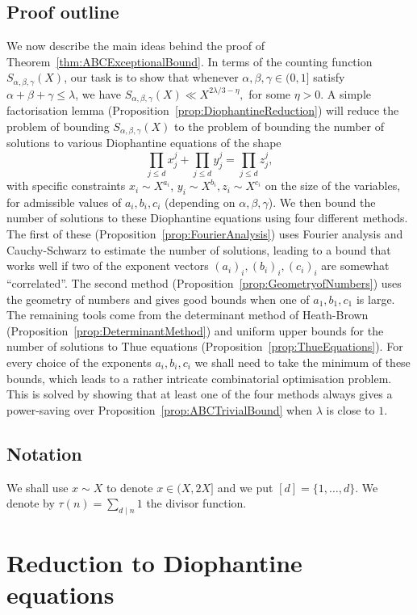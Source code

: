 \section*{Proof outline} We now describe the main ideas behind the proof of Theorem~\ref{thm:ABCExceptionalBound}. In terms of the counting function $S_{\alpha,\beta,\gamma}(X)$, our task is to show that whenever $\alpha,\beta,\gamma\in (0,1]$ satisfy $\alpha+\beta+\gamma\leq \lambda$, we have
$
S_{\alpha,\beta,\gamma}(X)\ll X^{2\lambda/3-\eta},
$
for some $\eta>0$.
A simple factorisation lemma (Proposition~\ref{prop:DiophantineReduction}) will reduce the problem of bounding $S_{\alpha,\beta,\gamma}(X)$ to the problem of bounding the number of solutions to various Diophantine equations of the shape
\[
\prod_{j\leq d}x_j^j+\prod_{j\leq d}y_j^j=\prod_{j\leq d}z_j^j ,
\]
with specific constraints $x_i\sim X^{a_i}$, $y_i\sim X^{b_i}, z_i\sim X^{c_i}$ on the size of the variables, for admissible values of $a_i,b_i,c_i$ (depending on $\alpha,\beta,\gamma$).
We then bound the number of solutions to these Diophantine equations using four different methods. The first of these (Proposition~\ref{prop:FourierAnalysis}) uses Fourier analysis and Cauchy-Schwarz to estimate the number of solutions, leading to a bound that works well if two of the exponent vectors $(a_i)_i,(b_i)_i,(c_i)_i$ are somewhat ``correlated''. The second method (Proposition~\ref{prop:GeometryofNumbers}) uses the geometry of numbers and gives good bounds when
one of $a_1,b_1,c_1$ is large. The remaining tools come from the determinant method of Heath-Brown (Proposition~\ref{prop:DeterminantMethod}) and
uniform upper bounds for the number of solutions to Thue equations (Proposition~\ref{prop:ThueEquations}).
For every choice of the exponents $a_i,b_i,c_i$ we shall need to take the minimum of these bounds, which leads to a rather intricate combinatorial optimisation problem. This is solved by showing that at least one of the four methods always gives a power-saving over Proposition~\ref{prop:ABCTrivialBound} when $\lambda$ is close to $1$.

\section*{Notation}
We shall use $x\sim X$ to denote $x\in (X,2X]$ and we put
$[d]=\{1,\dots,d\}$. We denote by $\tau(n)=\sum_{d\mid n}1$ the divisor function.


\chapter{Reduction to Diophantine equations}


